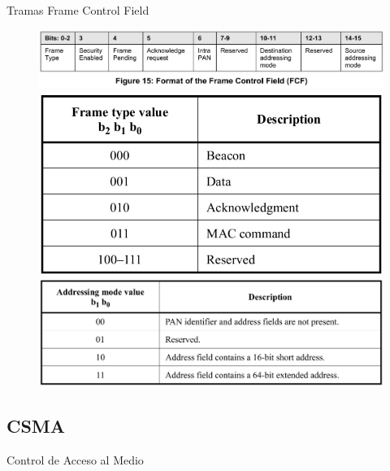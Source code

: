 \documentclass[aspectratio=169]{beamer}
\begin{document}
\begin{frame}[t]{Tramas}
Frame Control Field
	\begin{figure}[H]
	\centering
		\includegraphics[height=.3\textheight]{./imagenes/FCF.jpg}\\
		\vspace{20px}
		\includegraphics[height=.3\textheight]{./imagenes/frametype.jpg}
		\hspace{20px} 
		\includegraphics[height=.3\textheight]{./imagenes/addressingmode.jpg}
	\end{figure} 	
\end{frame}


\subsection[CSMA]{CSMA}

\begin{frame}[T]{Control de Acceso al Medio}

\end{frame}
\end{document}

